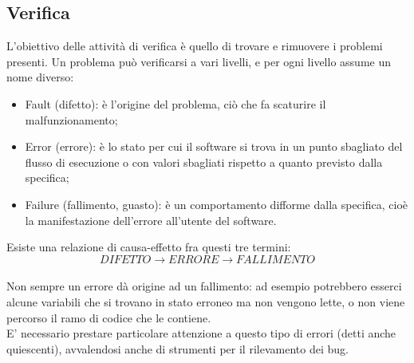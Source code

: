 {	\subsection{Verifica}
	L'obiettivo delle attività di verifica è quello di trovare e rimuovere i problemi presenti. Un problema può verificarsi a vari livelli, e per ogni livello assume un nome diverso:
		\begin{itemize}
			\item Fault (difetto): è l'origine del problema, ciò che fa scaturire il malfunzionamento;
			\item Error (errore): è lo stato per cui il software si trova in un punto sbagliato del flusso di esecuzione o con valori sbagliati rispetto a quanto previsto dalla specifica;
			\item Failure (fallimento, guasto): è un comportamento difforme dalla specifica, cioè la manifestazione dell'errore all'utente del software.
		\end{itemize}
		Esiste una relazione di causa-effetto fra questi tre termini:\\
		\[DIFETTO\longrightarrow ERRORE\longrightarrow FALLIMENTO\]\\
		Non sempre un errore dà origine ad un fallimento: ad esempio potrebbero esserci alcune variabili che si trovano in stato erroneo ma non vengono lette, o non viene percorso il ramo di codice che le contiene.\\
		E' necessario prestare particolare attenzione a questo tipo di errori (detti anche quiescenti), avvalendosi anche di strumenti per il rilevamento dei bug.
	}
	
